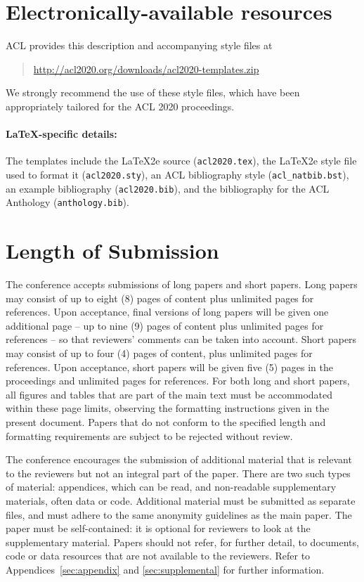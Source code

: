 \documentclass[11pt,a4paper]{article}
\begin{document}
\section{Electronically-available resources}

ACL provides this description and accompanying style files at
\begin{quote}
\url{http://acl2020.org/downloads/acl2020-templates.zip}
\end{quote}
We strongly recommend the use of these style files, which have been appropriately tailored for the ACL 2020 proceedings.

\paragraph{\LaTeX-specific details:}
The templates include the \LaTeX2e{} source (\texttt{\small acl2020.tex}),
the \LaTeX2e{} style file used to format it (\texttt{\small acl2020.sty}),
an ACL bibliography style (\texttt{\small acl\_natbib.bst}),
an example bibliography (\texttt{\small acl2020.bib}),
and the bibliography for the ACL Anthology (\texttt{\small anthology.bib}).


\section{Length of Submission}
\label{sec:length}

The conference accepts submissions of long papers and short papers.
Long papers may consist of up to eight (8) pages of content plus unlimited pages for references.
Upon acceptance, final versions of long papers will be given one additional page -- up to nine (9) pages of content plus unlimited pages for references -- so that reviewers' comments can be taken into account.
Short papers may consist of up to four (4) pages of content, plus unlimited pages for references.
Upon acceptance, short papers will be given five (5) pages in the proceedings and unlimited pages for references. 
For both long and short papers, all figures and tables that are part of the main text must be accommodated within these page limits, observing the formatting instructions given in the present document.
Papers that do not conform to the specified length and formatting requirements are subject to be rejected without review.

The conference encourages the submission of additional material that is relevant to the reviewers but not an integral part of the paper.
There are two such types of material: appendices, which can be read, and non-readable supplementary materials, often data or code.
Additional material must be submitted as separate files, and must adhere to the same anonymity guidelines as the main paper.
The paper must be self-contained: it is optional for reviewers to look at the supplementary material.
Papers should not refer, for further detail, to documents, code or data resources that are not available to the reviewers.
Refer to Appendices~\ref{sec:appendix} and \ref{sec:supplemental} for further information. 
\end{document}

